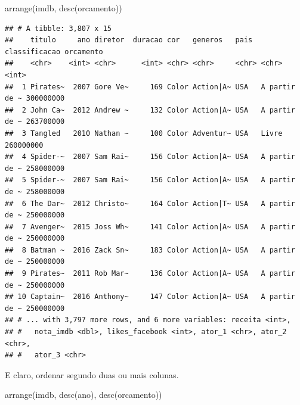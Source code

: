 \documentclass[
]{book}
\newenvironment{Shaded}{\begin{snugshade}}{\end{snugshade}}
\newcommand{\FunctionTok}[1]{\textcolor[rgb]{0.00,0.00,0.00}{#1}}
\newcommand{\NormalTok}[1]{#1}
\begin{document}
\begin{Shaded}
\begin{Highlighting}[]
\FunctionTok{arrange}\NormalTok{(imdb, }\FunctionTok{desc}\NormalTok{(orcamento))}
\end{Highlighting}
\end{Shaded}

\begin{verbatim}
## # A tibble: 3,807 x 15
##    titulo     ano diretor  duracao cor   generos   pais  classificacao orcamento
##    <chr>    <int> <chr>      <int> <chr> <chr>     <chr> <chr>             <int>
##  1 Pirates~  2007 Gore Ve~     169 Color Action|A~ USA   A partir de ~ 300000000
##  2 John Ca~  2012 Andrew ~     132 Color Action|A~ USA   A partir de ~ 263700000
##  3 Tangled   2010 Nathan ~     100 Color Adventur~ USA   Livre         260000000
##  4 Spider-~  2007 Sam Rai~     156 Color Action|A~ USA   A partir de ~ 258000000
##  5 Spider-~  2007 Sam Rai~     156 Color Action|A~ USA   A partir de ~ 258000000
##  6 The Dar~  2012 Christo~     164 Color Action|T~ USA   A partir de ~ 250000000
##  7 Avenger~  2015 Joss Wh~     141 Color Action|A~ USA   A partir de ~ 250000000
##  8 Batman ~  2016 Zack Sn~     183 Color Action|A~ USA   A partir de ~ 250000000
##  9 Pirates~  2011 Rob Mar~     136 Color Action|A~ USA   A partir de ~ 250000000
## 10 Captain~  2016 Anthony~     147 Color Action|A~ USA   A partir de ~ 250000000
## # ... with 3,797 more rows, and 6 more variables: receita <int>,
## #   nota_imdb <dbl>, likes_facebook <int>, ator_1 <chr>, ator_2 <chr>,
## #   ator_3 <chr>
\end{verbatim}

E claro, ordenar segundo duas ou mais colunas.

\begin{Shaded}
\begin{Highlighting}[]
\FunctionTok{arrange}\NormalTok{(imdb, }\FunctionTok{desc}\NormalTok{(ano), }\FunctionTok{desc}\NormalTok{(orcamento))}
\end{Highlighting}
\end{Shaded}
\end{document}
